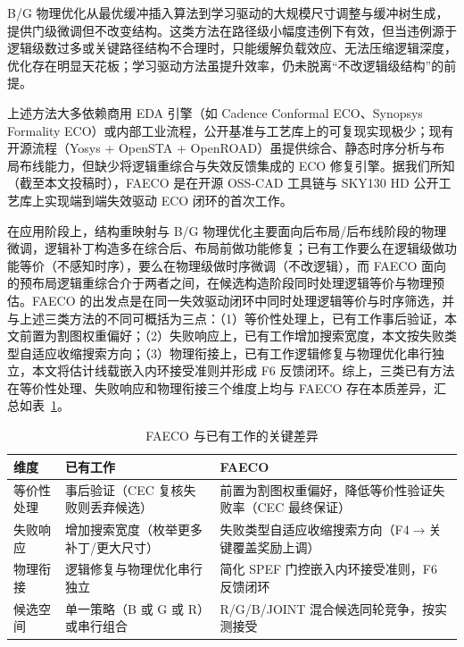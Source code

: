 \documentclass[journal]{IEEEtran}
\begin{document}
B/G 物理优化从最优缓冲插入算法\cite{liang2012buffer}到学习驱动的大规模尺寸调整与缓冲树生成\cite{liu2021rlsizer,huang2025phys,chen2024aito,zhang2025buffalo}，提供门级微调但不改变结构。这类方法在路径级小幅度违例下有效，但当违例源于逻辑级数过多或关键路径结构不合理时，只能缓解负载效应、无法压缩逻辑深度，优化存在明显天花板\cite{liu2021rlsizer,huang2025phys}；学习驱动方法\cite{chen2024aito,zhang2025buffalo}虽提升效率，仍未脱离“不改逻辑级结构”的前提。

上述方法大多依赖商用 EDA 引擎（如 Cadence Conformal ECO、Synopsys Formality ECO）或内部工业流程，公开基准与工艺库上的可复现实现极少；现有开源流程（Yosys + OpenSTA + OpenROAD）虽提供综合、静态时序分析与布局布线能力，但缺少将逻辑重综合与失效反馈集成的 ECO 修复引擎。据我们所知（截至本文投稿时），FAECO 是在开源 OSS-CAD 工具链与 SKY130 HD 公开工艺库上实现端到端失效驱动 ECO 闭环的首次工作。

在应用阶段上，结构重映射与 B/G 物理优化主要面向后布局/后布线阶段的物理微调，逻辑补丁构造多在综合后、布局前做功能修复；已有工作要么在逻辑级做功能等价（不感知时序），要么在物理级做时序微调（不改逻辑），而 FAECO 面向的预布局逻辑重综合介于两者之间，在候选构造阶段同时处理逻辑等价与物理预估。FAECO 的出发点是在同一失效驱动闭环中同时处理逻辑等价与时序筛选，并与上述三类方法的不同可概括为三点：（1）等价性处理上，已有工作事后验证，本文前置为割图权重偏好；（2）失败响应上，已有工作增加搜索宽度，本文按失败类型自适应收缩搜索方向；（3）物理衔接上，已有工作逻辑修复与物理优化串行独立，本文将估计线载嵌入内环接受准则并形成 F6 反馈闭环。综上，三类已有方法在等价性处理、失败响应和物理衔接三个维度上均与 FAECO 存在本质差异，汇总如表~\ref{tab:related_diff}。

\begin{table}[!t]
\centering
\caption{FAECO 与已有工作的关键差异}
\label{tab:related_diff}
\footnotesize
\setlength{\tabcolsep}{3pt}
\begin{tabular}{p{2.2cm}p{2.8cm}p{3.2cm}}
\toprule
\textbf{维度} & \textbf{已有工作} & \textbf{FAECO} \\
\midrule
等价性处理 & 事后验证（CEC 复核失败则丢弃候选） & 前置为割图权重偏好，降低等价性验证失败率（CEC 最终保证） \\
失败响应 & 增加搜索宽度（枚举更多补丁/更大尺寸） & 失败类型自适应收缩搜索方向（F4$\to$关键覆盖奖励上调） \\
物理衔接 & 逻辑修复与物理优化串行独立 & 简化 SPEF 门控嵌入内环接受准则，F6 反馈闭环 \\
候选空间 & 单一策略（B 或 G 或 R）或串行组合 & R/G/B/JOINT 混合候选同轮竞争，按实测接受 \\
\bottomrule
\end{tabular}
\end{table}
\end{document}
